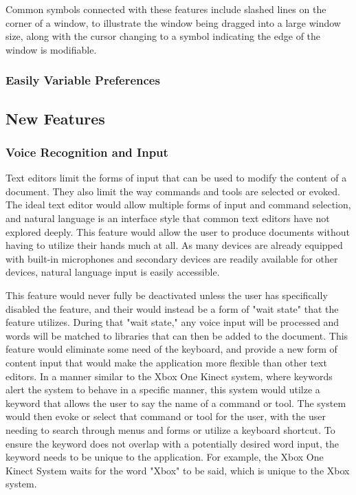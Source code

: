 \documentclass[11pt, oneside]{article}
\begin{document}
Common symbols connected with these features include slashed lines on the corner of a window, to illustrate the window being dragged into a large window size, along with the cursor changing to a symbol indicating the edge of the window is modifiable. 

\subsubsection{Easily Variable Preferences}

\subsection{New Features}
\subsubsection{Voice Recognition and Input}
Text editors limit the forms of input that can be used to modify the content of a document. They also limit the way commands and tools are selected or evoked. The ideal text editor would allow multiple forms of input and command selection, and natural language is an interface style that common text editors have not explored deeply. This feature would allow the user to produce documents without having to utilize their hands much at all. As many devices are already equipped with built-in microphones and secondary devices are readily available for other devices, natural language input is easily accessible. 

This feature would never fully be deactivated unless the user has specifically disabled the feature, and their would instead be a form of "wait state" that the feature utilizes. During that "wait state," any voice input will be processed and words will be matched to libraries that can then be added to the document. This feature would eliminate some need of the keyboard, and provide a new form of content input that would make the application more flexible than other text editors. In a manner similar to the Xbox One Kinect system, where keywords alert the system to behave in a specific manner, this system would utilze a keyword that allows the user to say the name of a command or tool. The system would then evoke or select that command or tool for the user, with the user needing to search through menus and forms or utilize a keyboard shortcut. To ensure the keyword does not overlap with a potentially desired word input, the keyword needs to be unique to the application. For example, the Xbox One Kinect System waits for the word "Xbox" to be said, which is unique to the Xbox system. 
\end{document}
